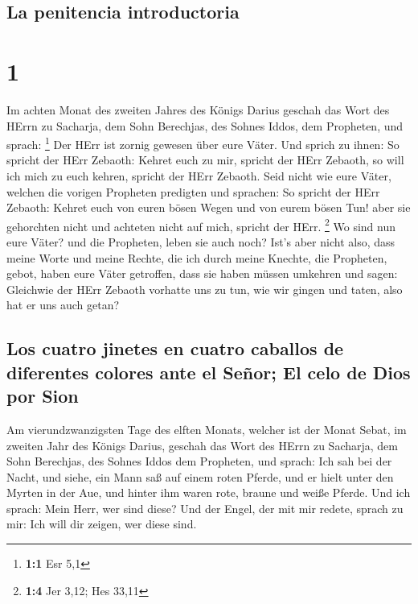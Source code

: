 \hypertarget{la-penitencia-introductoria}{%
\subsection{La penitencia
introductoria}\label{la-penitencia-introductoria}}

\hypertarget{section}{%
\section{1}\label{section}}

 Im achten Monat des zweiten Jahres des Königs Darius
geschah das Wort des HErrn zu Sacharja, dem Sohn Berechjas, des Sohnes
Iddos, dem Propheten, und sprach: \footnote{\textbf{1:1} Esr 5,1}
 Der HErr ist zornig gewesen über eure Väter.
 Und sprich zu ihnen: So spricht der HErr Zebaoth: Kehret
euch zu mir, spricht der HErr Zebaoth, so will ich mich zu euch kehren,
spricht der HErr Zebaoth.  Seid nicht wie eure Väter,
welchen die vorigen Propheten predigten und sprachen: So spricht der
HErr Zebaoth: Kehret euch von euren bösen Wegen und von eurem bösen Tun!
aber sie gehorchten nicht und achteten nicht auf mich, spricht der HErr.
\footnote{\textbf{1:4} Jer 3,12; Hes 33,11}  Wo sind nun
eure Väter? und die Propheten, leben sie auch noch?  Ist's
aber nicht also, dass meine Worte und meine Rechte, die ich durch meine
Knechte, die Propheten, gebot, haben eure Väter getroffen, dass sie
haben müssen umkehren und sagen: Gleichwie der HErr Zebaoth vorhatte uns
zu tun, wie wir gingen und taten, also hat er uns auch getan?

\hypertarget{los-cuatro-jinetes-en-cuatro-caballos-de-diferentes-colores-ante-el-seuxf1or-el-celo-de-dios-por-sion}{%
\subsection{Los cuatro jinetes en cuatro caballos de diferentes colores
ante el Señor; El celo de Dios por
Sion}\label{los-cuatro-jinetes-en-cuatro-caballos-de-diferentes-colores-ante-el-seuxf1or-el-celo-de-dios-por-sion}}

 Am vierundzwanzigsten Tage des elften Monats, welcher ist
der Monat Sebat, im zweiten Jahr des Königs Darius, geschah das Wort des
HErrn zu Sacharja, dem Sohn Berechjas, des Sohnes Iddos dem Propheten,
und sprach:  Ich sah bei der Nacht, und siehe, ein Mann
saß auf einem roten Pferde, und er hielt unter den Myrten in der Aue,
und hinter ihm waren rote, braune und weiße Pferde.  Und
ich sprach: Mein Herr, wer sind diese? Und der Engel, der mit mir
redete, sprach zu mir: Ich will dir zeigen, wer diese sind.

